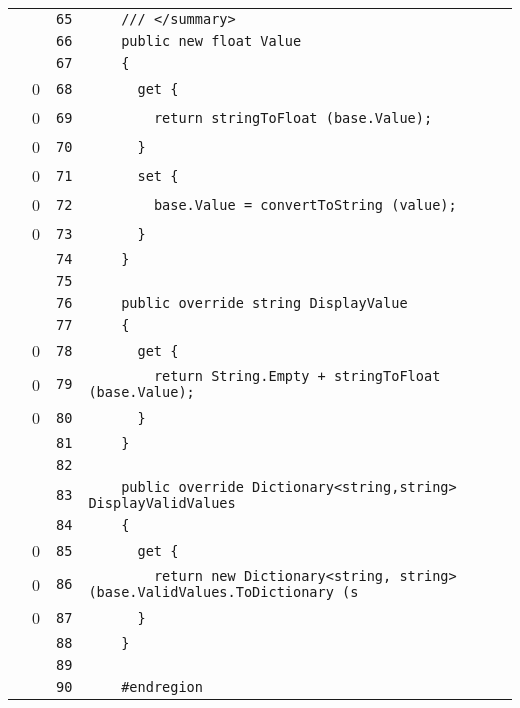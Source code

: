 \documentclass[a4paper,10pt]{article}
\begin{document}
\begin{longtable}[l]{lrrl}
\cellcolor{gray} &  & \verb~65~ & \verb~    /// </summary>~\\
\cellcolor{gray} &  & \verb~66~ & \verb~    public new float Value~\\
\cellcolor{gray} &  & \verb~67~ & \verb~    {~\\
\cellcolor{red} & 0 & \verb~68~ & \verb~      get {~\\
\cellcolor{red} & 0 & \verb~69~ & \verb~        return stringToFloat (base.Value);~\\
\cellcolor{red} & 0 & \verb~70~ & \verb~      }~\\
\cellcolor{red} & 0 & \verb~71~ & \verb~      set {~\\
\cellcolor{red} & 0 & \verb~72~ & \verb~        base.Value = convertToString (value);~\\
\cellcolor{red} & 0 & \verb~73~ & \verb~      }~\\
\cellcolor{gray} &  & \verb~74~ & \verb~    }~\\
\cellcolor{gray} &  & \verb~75~ & \verb~~\\
\cellcolor{gray} &  & \verb~76~ & \verb~    public override string DisplayValue~\\
\cellcolor{gray} &  & \verb~77~ & \verb~    {~\\
\cellcolor{red} & 0 & \verb~78~ & \verb~      get {~\\
\cellcolor{red} & 0 & \verb~79~ & \verb~        return String.Empty + stringToFloat (base.Value);~\\
\cellcolor{red} & 0 & \verb~80~ & \verb~      }~\\
\cellcolor{gray} &  & \verb~81~ & \verb~    }~\\
\cellcolor{gray} &  & \verb~82~ & \verb~~\\
\cellcolor{gray} &  & \verb~83~ & \verb~    public override Dictionary<string,string> DisplayValidValues~\\
\cellcolor{gray} &  & \verb~84~ & \verb~    {~\\
\cellcolor{red} & 0 & \verb~85~ & \verb~      get {~\\
\cellcolor{red} & 0 & \verb~86~ & \verb~        return new Dictionary<string, string>(base.ValidValues.ToDictionary (s~\\
\cellcolor{red} & 0 & \verb~87~ & \verb~      }~\\
\cellcolor{gray} &  & \verb~88~ & \verb~    }~\\
\cellcolor{gray} &  & \verb~89~ & \verb~~\\
\cellcolor{gray} &  & \verb~90~ & \verb~    #endregion~\\

\end{longtable}
\end{document}
